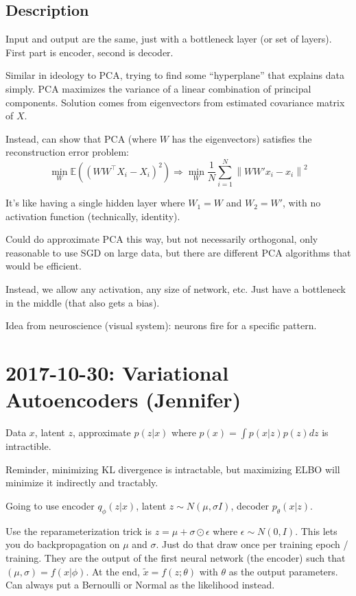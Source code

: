 \documentclass{article}
\newcommand{\norm}[1]{{ \ensuremath{ \left\lVert  #1 \right\rVert  }  }}
\newcommand{\E}{ \ensuremath{ \mathbb{E} }}
\begin{document}
\subsection{Description}
Input and output are the same, just with a bottleneck layer (or set of layers). First part is encoder, second is
decoder.

Similar in ideology to PCA, trying to find some ``hyperplane'' that explains data simply. PCA maximizes
the variance of a linear combination of principal components. Solution comes from eigenvectors from estimated
covariance matrix of $X$.

Instead, can show that PCA (where $W$ has the eigenvectors) satisfies the reconstruction error problem:
\begin{equation*}
  \min_W\E \left( (WW^\top X_i - X_i)^2 \right)\Rightarrow\min_W \frac{1}{N} \sum_{i=1}^N\norm{WW'x_i-x_i}^2
\end{equation*}

It's like having a single hidden layer where $W_1=W$ and $W_2=W'$, with no activation function (technically, identity).

Could do approximate PCA this way, but not necessarily orthogonal, only reasonable to use SGD on large data, but there
are different PCA algorithms that would be efficient.

Instead, we allow any activation, any size of network, etc. Just have a bottleneck in the middle (that also gets a bias).

Idea from neuroscience (visual system): neurons fire for a specific pattern.


\section{2017-10-30: Variational Autoencoders (Jennifer)}

Data $x$, latent $z$, approximate $p(z|x)$ where $p(x)=\int p(x|z)p(z)dz$ is intractible.

Reminder, minimizing KL divergence is intractable, but maximizing ELBO will minimize it indirectly and tractably.

Going to use encoder $q_\phi(z|x)$, latent $z\sim N(\mu, \sigma I)$, decoder $p_\theta(x|z)$.

Use the reparameterization trick is $z=\mu+\sigma \odot \epsilon$ where $\epsilon\sim N(0,I)$. This lets you do
backpropagation on $\mu$ and $\sigma$. Just do that draw once per training epoch / training. They are the output of the first
neural network (the encoder) such that $(\mu, \sigma)=f(x|\phi)$. At the end, $\tilde{x}=f(z;\theta)$ with $\theta$ as the
output parameters. Can always put a Bernoulli or Normal as the likelihood instead.
\end{document}
